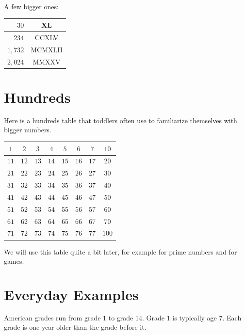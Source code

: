 A few bigger ones:

\begin{center}
\setlength{\tabcolsep}{0.8em}
\begin{tabular}{|r|c|}
\hline
$30$ & XL \\
\hline
$234$ & CCXLV \\
\hline
$1{,}732$ & MCMXLII \\
\hline
$2{,}024$ & MMXXV \\
\hline
\end{tabular}
\end{center}

\section{Hundreds}
\label{sec:hundreds}

Here is a hundreds table that toddlers often use to familiarize themselves with bigger numbers.

\begin{center}
\setlength{\tabcolsep}{0.55em}
\begin{tabular}{|c|c|c|c|c|c|c|c|}
\hline
$1$ & $2$ & $3$ & $4$ & $5$ & $6$ & $7$ & $10$ \\
\hline
$11$ & $12$ & $13$ & $14$ & $15$ & $16$ & $17$ & $20$ \\
\hline
$21$ & $22$ & $23$ & $24$ & $25$ & $26$ & $27$ & $30$ \\
\hline
$31$ & $32$ & $33$ & $34$ & $35$ & $36$ & $37$ & $40$ \\
\hline
$41$ & $42$ & $43$ & $44$ & $45$ & $46$ & $47$ & $50$ \\
\hline
$51$ & $52$ & $53$ & $54$ & $55$ & $56$ & $57$ & $60$ \\
\hline
$61$ & $62$ & $63$ & $64$ & $65$ & $66$ & $67$ & $70$ \\
\hline
$71$ & $72$ & $73$ & $74$ & $75$ & $76$ & $77$ & $100$ \\
\hline
\end{tabular}
\end{center}

We will use this table quite a bit later, for example for prime numbers and for games.

\section{Everyday Examples}

American grades run from grade $1$ to grade $14$. Grade $1$ is typically age $7$. Each grade is one year older than the grade before it.

